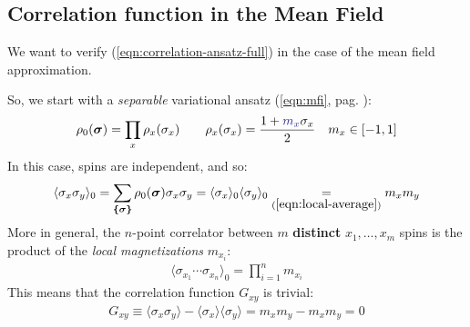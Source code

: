 \documentclass[../../main.tex]{subfiles}
\begin{document}
\subsection{Correlation function in the Mean Field}
We want to verify (\ref{eqn:correlation-ansatz-full}) in the case of the mean field approximation. 

\medskip

So, we start with a \textit{separable} variational ansatz (\ref{eqn:mfi}, pag. \pageref{eqn:mfi}):
\begin{align} 
    \rho_0(\bm{\sigma}) = \prod_x \rho_x(\sigma_x) \qquad \rho_x(\sigma_x) = \frac{1+\textcolor{Blue}{m_x} \sigma_x}{2} \quad m_x \in [-1,1]
\end{align}
In this case, spins are independent, and so:
\begin{align*}
    \langle \sigma_x \sigma_y \rangle_0 = \sum_{\bm{\{\bm{\sigma}\}}} \rho_0(\bm{\sigma}) \sigma_x \sigma_y = \langle \sigma_x \rangle_0 \langle \sigma_y \rangle_0 \underset{(\ref{eqn:local-average})}{=} m_x m_y
\end{align*}
More in general, the $n$-point correlator between $m$ \textbf{distinct} $x_1, \dots, x_m$ spins is the product of the \textit{local magnetizations} $m_{x_i}$:
\begin{align*}
    \langle \sigma_{x_1} \cdots \sigma_{x_n} \rangle_0 = \prod_{i=1}^n m_{x_i}
\end{align*} 
This means that the correlation function $G_{xy}$ is trivial:
\begin{align*}
    G_{xy} \equiv \langle \sigma_x \sigma_y \rangle - \langle \sigma_x  \rangle \langle \sigma_y \rangle = m_x m_y - m_x m_y = 0
\end{align*}
\end{document}
